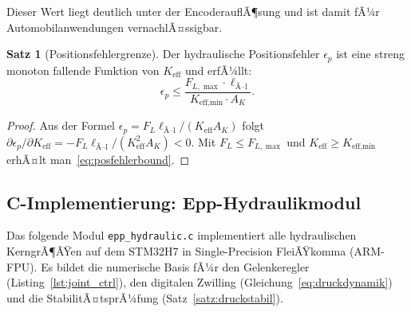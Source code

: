 ﻿\documentclass[a4paper,12pt]{scrreprt}
\theoremstyle{definition}
\newtheorem{satz}{Satz}[section]
\begin{document}
Dieser Wert liegt deutlich unter der EncoderauflÃ¶sung und ist damit
fÃ¼r Automobilanwendungen vernachlÃ¤ssigbar.

\begin{satz}[Positionsfehlergrenze]
\label{satz:posfehler}
Der hydraulische Positionsfehler $\epsilon_p$ ist eine streng monoton
fallende Funktion von $K_{\text{eff}}$ und erfÃ¼llt:
\begin{equation}
  \epsilon_p \leq \frac{F_{L,\max} \cdot \ell_{\text{Ã–l}}}
                       {K_{\text{eff,min}} \cdot A_K}.
  \label{eq:posfehlerbound}
\end{equation}
\end{satz}

\begin{proof}
Aus der Formel $\epsilon_p = F_L \ell_{\text{Ã–l}}/(K_{\text{eff}} A_K)$
folgt $\partial\epsilon_p/\partial K_{\text{eff}} = -F_L \ell_{\text{Ã–l}}/(K_{\text{eff}}^2 A_K) < 0$.
Mit $F_L \leq F_{L,\max}$ und $K_{\text{eff}} \geq K_{\text{eff,min}}$
erhÃ¤lt man~\eqref{eq:posfehlerbound}.
\end{proof}

\subsection{C-Implementierung: Epp-Hydraulikmodul}

Das folgende Modul \texttt{epp\_hydraulic.c} implementiert alle
hyd\-rau\-li\-schen KerngrÃ¶ÃŸen auf dem STM32H7 in Single-Precision
FleiÃŸkomma (ARM-FPU). Es bildet die numerische Basis fÃ¼r den
Gelenkeregler (Listing~\ref{lst:joint_ctrl}), den digitalen Zwilling
(Gleichung~\ref{eq:druckdynamik}) und die Stabili\-tÃ¤ts\-prÃ¼fung
(Satz~\ref{satz:druckstabil}).
\end{document}
